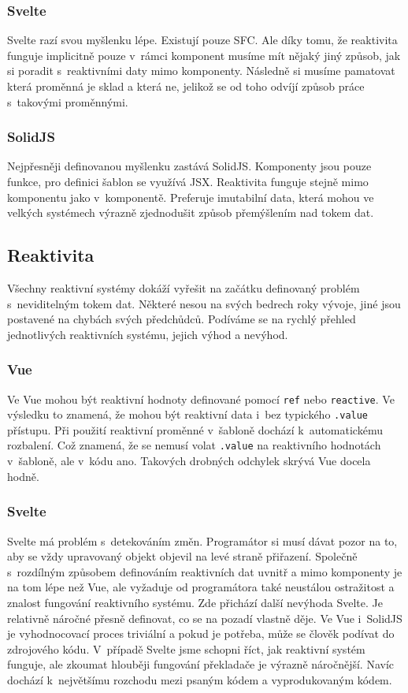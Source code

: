 \documentclass[
  master,
  program=ainf,
  printversion,
  tables=false,
  sourcecodes,
  glossaries,
  index
]{kidiplom}
\begin{document}
\subsubsection{Svelte}
Svelte razí svou myšlenku lépe. Existují pouze SFC. Ale díky tomu, že reaktivita funguje implicitně pouze v~rámci
komponent musíme mít nějaký jiný způsob, jak si poradit s~reaktivními daty mimo komponenty. Následně si musíme
pamatovat která proměnná je sklad a která ne, jelikož se od toho odvíjí způsob práce s~takovými proměnnými.

\subsubsection{SolidJS}
Nejpřesněji definovanou myšlenku zastává SolidJS. Komponenty jsou pouze fun\-kce, pro definici šablon se využívá
JSX. Reaktivita funguje stejně mimo komponentu jako v~komponentě. Preferuje imutabilní data, která mohou ve 
velkých systémech výrazně zjednodušit způsob přemýšlením nad tokem dat.

\subsection{Reaktivita}
Všechny reaktivní systémy dokáží vyřešit na začátku definovaný problém s~neviditelným tokem dat. 
Některé nesou na svých bedrech roky vývoje, jiné jsou postavené na chybách svých předchůdců. Podíváme se na rychlý
přehled jednotlivých reaktivních systému, jejich výhod a nevýhod.

\subsubsection{Vue}
Ve Vue mohou být reaktivní hodnoty definované pomocí {\tt ref} nebo {\tt reactive}. Ve výsledku to znamená, že mohou být 
reaktivní data i~bez typického {\tt .value} přístupu. Při použití reaktivní proměnné v~šabloně dochází k~automatickému
rozbalení. Což znamená, že se nemusí volat {\tt .value} na reaktivního hodnotách v~šabloně, ale v~kódu ano. Takových 
drobných odchylek skrývá Vue docela hodně.

\subsubsection{Svelte}
Svelte má problém s~detekováním změn. Programátor si musí dávat pozor na to, aby se vždy upravovaný objekt
objevil na levé straně přiřazení. Společně s~rozdílným způsobem definováním reaktivních dat uvnitř a mimo komponenty
je na tom lépe než Vue, ale vyžaduje od programátora také neustálou ostražitost a znalost fungování reaktivního 
systému. Zde přichází další nevýhoda Svelte. Je relativně náročné přesně definovat, co se na pozadí vlastně děje.
Ve Vue i~SolidJS je vyhodnocovací proces triviální a pokud je potřeba, může se člověk podívat do zdrojového kódu.
V~případě Svelte jsme schopni říct, jak reaktivní systém funguje, ale zkoumat hlouběji fungování překladače je
výrazně náročnější. Navíc dochází k~největšímu rozchodu mezi psaným kódem a vyprodukovaným kódem.
\end{document}
